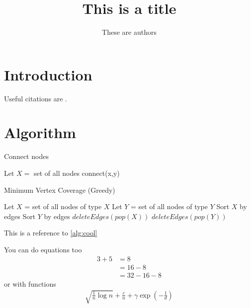 \documentclass{article}
\title{This is a title}
\author{These are authors}
\begin{document}
\maketitle

\section{Introduction}

Useful citations are \cite{KW14,GKK13}.

\section{Algorithm}

\begin{algorithm}[H]
\caption{Connect nodes}\label{alg:cool}
\begin{algorithmic}
\State Let $X =$ set of all nodes
\State connect(x,y)
\EndIf
\EndFor
\EndFor
\end{algorithmic}
\end{algorithm}

\begin{algorithm}[H]
\caption{Minimum Vertex Coverage (Greedy)}
\begin{algorithmic}
\State Let $X$ = set of all nodes of type $X$
\State Let $Y$ = set of all nodes of type $Y$
\State Sort $X$ by edges
\State Sort $Y$ by edges
\State $deleteEdges(pop(X))$
\Else
\State $deleteEdges(pop(Y))$
\EndIf
\EndWhile
\end{algorithmic}
\end{algorithm}

This is a reference to \cref{alg:cool}

You can do equations too
\begin{align}
3 + 5 
&= 8 \\
&= 16 - 8 \\
&= 32 - 16 - 8
\end{align}
or with functions
\begin{align}
\sqrt{\frac{1}{n} \log n} + \frac{c}{n} + \gamma \exp\left(-\frac{1}{d}\right)
\end{align}
\end{document}
